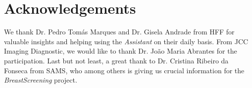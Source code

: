 \section*{Acknowledgements}
\label{sec:sec009}

We thank Dr. Pedro Tom\'{a}s Marques and Dr. Gisela Andrade from HFF for valuable insights and helping using the {\it Assistant} on their daily basis.
From JCC Imaging Diagnostic, we would like to thank Dr. Jo\~{a}o Maria Abrantes for the participation.
Last but not least, a great thank to Dr. Cristina Ribeiro da Fonseca from SAMS, who among others is giving us crucial information for the {\it BreastScreening} project.
